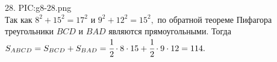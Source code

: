 28. {{PIC:g8-28.png}}\\
Так как $8^2+15^2=17^2$ и $9^2+12^2=15^2,$ по обратной теореме Пифагора треугольники $BCD$ и $BAD$ являются прямоугольными. Тогда $S_{ABCD}=S_{BCD}+S_{BAD}=\cfrac{1}{2}\cdot8\cdot15+\cfrac{1}{2}\cdot9\cdot12=114.$\\
